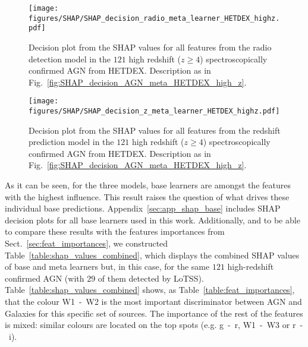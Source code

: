 \documentclass{aa}
\begin{document}
\begin{figure}
   \centering
   \begin{minipage}{0.75\columnwidth}
   \texttt{[image: figures/SHAP/SHAP\_decision\_radio\_meta\_learner\_HETDEX\_highz.pdf]}
   \end{minipage}
   \caption{Decision plot from the SHAP values for all features from the radio detection model in the $121$ high redshift ($z \geq 4$) spectroscopically confirmed AGN from HETDEX. Description as in Fig.~\ref{fig:SHAP_decision_AGN_meta_HETDEX_high_z}.}
   \label{fig:SHAP_decision_radio_meta_HETDEX_high_z}
\end{figure}

\begin{figure}
   \centering
   \begin{minipage}{0.85\columnwidth}
   \texttt{[image: figures/SHAP/SHAP\_decision\_z\_meta\_learner\_HETDEX\_highz.pdf]}
   \end{minipage}
   \caption{Decision plot from the SHAP values for all features from the redshift prediction model in the $121$ high redshift ($z \geq 4$) spectroscopically confirmed AGN from HETDEX. Description as in Fig.~\ref{fig:SHAP_decision_AGN_meta_HETDEX_high_z}.}
   \label{fig:SHAP_decision_z_meta_HETDEX_high_z}
\end{figure}

As it can be seen, for the three models, base learners are amongst the features with the highest influence. This result raises the question of what drives these individual base predictions. Appendix~\ref{sec:app_shap_base} includes SHAP decision plots for all base learners used in this work. Additionally, and to be able to compare these results with the features importances from Sect.~\ref{sec:feat_importances}, we constructed Table~\ref{table:shap_values_combined}, which displays the combined SHAP values of base and meta learners but, in this case, for the same $121$ high-redshift confirmed AGN (with $29$ of them detected by LoTSS). Table~\ref{table:shap_values_combined} shows, as Table~\ref{table:feat_importances}, that the colour W1~-~W2 is the most important discriminator between AGN and Galaxies for this specific set of sources. The importance of the rest of the features is mixed: similar colours are located on the top spots (e.g. g~-~r, W1~-~W3 or r~-~i).
\end{document}
